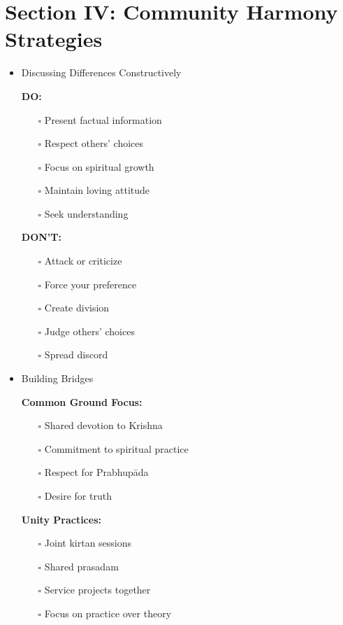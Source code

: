 \documentclass[11pt,twoside]{book}
\begin{document}
\section*{Section IV: Community Harmony Strategies}
\label{sec:orge49552a}

\begin{itemize}
\item Discussing Differences Constructively
\label{sec:org458910d}

\textbf{\textbf{DO:}}
\begin{itemize}
\item[{$\square$}] Present factual information
\item[{$\square$}] Respect others' choices
\item[{$\square$}] Focus on spiritual growth
\item[{$\square$}] Maintain loving attitude
\item[{$\square$}] Seek understanding
\end{itemize}

\textbf{\textbf{DON'T:}}
\begin{itemize}
\item[{$\square$}] Attack or criticize
\item[{$\square$}] Force your preference
\item[{$\square$}] Create division
\item[{$\square$}] Judge others' choices
\item[{$\square$}] Spread discord
\end{itemize}
\item Building Bridges
\label{sec:org8ee9366}

\textbf{\textbf{Common Ground Focus:}}
\begin{itemize}
\item[{$\square$}] Shared devotion to Krishna
\item[{$\square$}] Commitment to spiritual practice
\item[{$\square$}] Respect for Prabhupāda
\item[{$\square$}] Desire for truth
\end{itemize}

\textbf{\textbf{Unity Practices:}}
\begin{itemize}
\item[{$\square$}] Joint kirtan sessions
\item[{$\square$}] Shared prasadam
\item[{$\square$}] Service projects together
\item[{$\square$}] Focus on practice over theory
\end{itemize}
\end{itemize}
\end{document}
